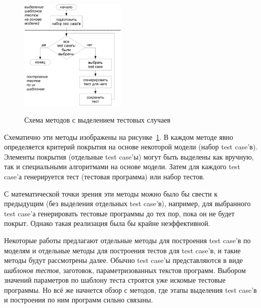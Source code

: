 \documentclass[14pt]{extreport}
\begin{document}
\begin{figure}[h] \center
  \includegraphics[width=0.45\textwidth]{1.review/methods2}\\
  \caption{Схема методов с выделением тестовых случаев}\label{fig:methods2}
\end{figure}

Схематично эти методы изображены на рисунке~\ref{fig:methods2}. В каждом методе явно определяется критерий покрытия на основе некоторой модели (набор test case'в). Элементы покрытия (отдельные test case'ы) могут быть выделены как вручную, так и специальными алгоритмами на основе модели. Затем для каждого test case'а генерируется тест (тестовая программа) или набор тестов.

С математической точки зрения эти методы можно было бы свести к предыдущим (без выделения отдельных test case'в), например, для выбранного test case'а генерировать тестовые программы до тех пор, пока он не будет покрыт. Однако такая реализация была бы крайне неэффективной.%

Некоторые работы предлагают отдельные методы для построения test case'в по моделям и отдельные методы для построения тестов для test case'в, и такие методы будут рассмотрены далее. Обычно test case'ы представляются в виде \emph{шаблонов тестов}, заготовок, параметризованных текстов программ. Выбором значений параметров по шаблону теста строятся уже искомые тестовые программы. Но всё же начнется обзор с методов, где этапы выделения test case'в и построения по ним программ сильно связаны.

\end{document}
